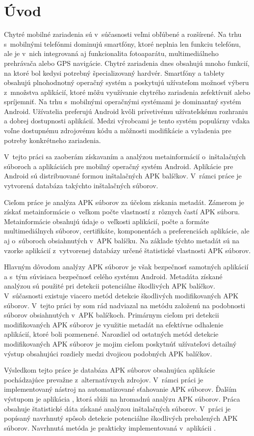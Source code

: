 \chapter{Úvod}
Chytré mobilné zariadenia sú v~súčasnosti veľmi obľúbené a rozšírené. Na trhu s~mobilnými telefónmi dominujú smartfóny, ktoré neplnia len funkciu telefónu, ale je v~nich integrovaná aj funkcionalita fotoaparátu, multimediálneho prehrávača alebo GPS navigácie. Chytré zariadenia dnes obsahujú mnoho funkcií, na ktoré bol kedysi potrebný špecializovaný hardvér. Smartfóny a tablety obsahujú plnohodnotný operačný systém a poskytujú užívateľom možnosť výberu z~množstva aplikácií, ktoré môžu využívanie chytrého zariadenia zefektívniť alebo spríjemniť. Na trhu s~mobilnými operačnými systémami je dominantný systém Android. Užívatelia preferujú Android kvôli prívetivému užívateľskému rozhraniu a dobrej dostupnosti aplikácií. Medzi výrobcami je tento systém populárny vďaka voľne dostupnému zdrojovému kódu a môžnosti modifikácie a vyladenia pre potreby konkrétneho zariadenia.

V~tejto práci sa zaoberám získavaním a analýzou metainformácií o~inštalačných súboroch a aplikáciách pre mobilný operačný systém Android. Aplikácie pre Android sú distribuované formou inštalačných APK balíčkov. V~rámci práce je vytvorená databáza takýchto inštalačných súborov. 

Cieľom práce je analýza APK súborov za účelom získania metadát. Zámerom je získať metainformácie o~veľkom počte vlastností z~rôznych častí APK súboru. Metainformácie obsahujú údaje o~veľkosti aplikácií, počte a formáte multimediálnych súborov, certifikáte, komponentách a preferenciách aplikácie, ale aj o~súboroch obsiahnutých v~APK balíčku. Na základe týchto metadát sú na vzorke aplikácií z~vytvorenej databázy určené štatistické vlastnosti APK súborov. 

Hlavným dôvodom analýzy APK súborov je však bezpečnosť samotných aplikácií a s~tým súvisiaca bezpečnosť celého systému Android. Metadáta získané analýzou sú použité pri detekcii potenciálne škodlivých APK balíčkov.
V~súčasnosti existuje viacero metód detekcie škodlivých modifikovaných APK  súborov. V~tejto práci by som rád nadviazal na metódu založenú na podobnosti súborov obsiahnutých v~APK balíčkoch.
Primárnym cieľom pri detekcii modifikovaných APK súborov je využitie metadát na efektívne odhalenie aplikácií, ktoré boli pozmenené. Narozdiel od ostatných metód detekcie modifikovaných APK súborov je mojim cieľom poskytnúť užívateľovi detailný výstup obsahujúci rozdiely medzi dvojicou podobných APK balíčkov.

Výsledkom tejto práce je databáza APK súborov obsahujúca aplikácie pochádzajúce prevažne z~alternatívnych zdrojov. V~rámci práci je implementovaný nástroj na automatizované sťahovanie APK súborov. Ďalším výstupom je aplikácia , ktorá slúži na hromadnú analýzu APK súborov. Práca obsahuje štatistické dáta získané analýzou inštalačných súborov. V~práci je popísaný navrhnutý spôsob detekcie potenciálne škodlivých prebalených APK súborov. Navrhnutá metóda je prakticky implementovaná v~aplikácii .